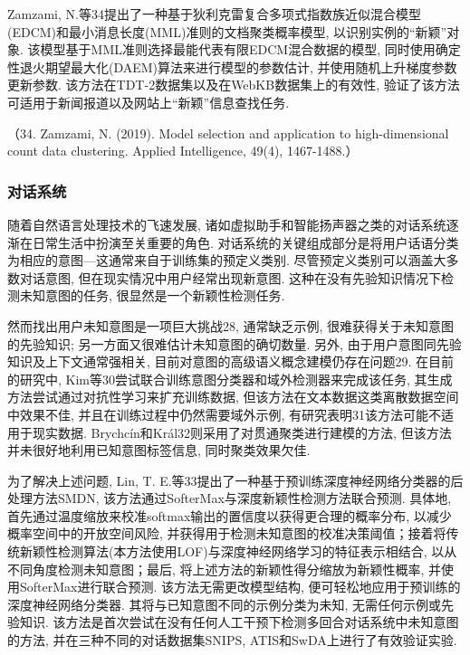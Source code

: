 \documentclass{Style/aas}
\begin{document}
\begin{multicols}{2}
  Zamzami, N.等34提出了一种基于狄利克雷复合多项式指数族近似混合模型(EDCM)和最小消息长度(MML)准则的文档聚类概率模型, 以识别实例的“新颖”对象. 该模型基于MML准则选择最能代表有限EDCM混合数据的模型, 同时使用确定性退火期望最大化(DAEM)算法来进行模型的参数估计, 并使用随机上升梯度参数更新参数. 该方法在TDT-2数据集以及在WebKB数据集上的有效性, 验证了该方法可适用于新闻报道以及网站上“新颖”信息查找任务.

  （34.	Zamzami, N. (2019). Model selection and application to high-dimensional count data clustering. Applied Intelligence, 49(4), 1467-1488.）

  \subsubsection{对话系统}
  随着自然语言处理技术的飞速发展, 诸如虚拟助手和智能扬声器之类的对话系统逐渐在日常生活中扮演至关重要的角色. 对话系统的关键组成部分是将用户话语分类为相应的意图—这通常来自于训练集的预定义类别. 尽管预定义类别可以涵盖大多数对话意图, 但在现实情况中用户经常出现新意图. 这种在没有先验知识情况下检测未知意图的任务, 很显然是一个新颖性检测任务.

  然而找出用户未知意图是一项巨大挑战28, 通常缺乏示例, 很难获得关于未知意图的先验知识; 另一方面又很难估计未知意图的确切数量. 另外, 由于用户意图同先验知识及上下文通常强相关, 目前对意图的高级语义概念建模仍存在问题29. 在目前的研究中, Kim等30尝试联合训练意图分类器和域外检测器来完成该任务, 其生成方法尝试通过对抗性学习来扩充训练数据, 但该方法在文本数据这类离散数据空间中效果不佳, 并且在训练过程中仍然需要域外示例, 有研究表明31该方法可能不适用于现实数据. Brychcín和Král32则采用了对贯通聚类进行建模的方法, 但该方法并未很好地利用已知意图标签信息, 同时聚类效果欠佳.

  为了解决上述问题, Lin, T. E.等33提出了一种基于预训练深度神经网络分类器的后处理方法SMDN, 该方法通过SofterMax与深度新颖性检测方法联合预测. 具体地, 首先通过温度缩放来校准softmax输出的置信度以获得更合理的概率分布, 以减少概率空间中的开放空间风险, 并获得用于检测未知意图的校准决策阈值；接着将传统新颖性检测算法(本方法使用LOF)与深度神经网络学习的特征表示相结合, 以从不同角度检测未知意图；最后, 将上述方法的新颖性得分缩放为新颖性概率, 并使用SofterMax进行联合预测. 该方法无需更改模型结构, 便可轻松地应用于预训练的深度神经网络分类器. 其将与已知意图不同的示例分类为未知, 无需任何示例或先验知识. 该方法是首次尝试在没有任何人工干预下检测多回合对话系统中未知意图的方法, 并在三种不同的对话数据集SNIPS, ATIS和SwDA上进行了有效验证实验.


\end{multicols}
\end{document}
